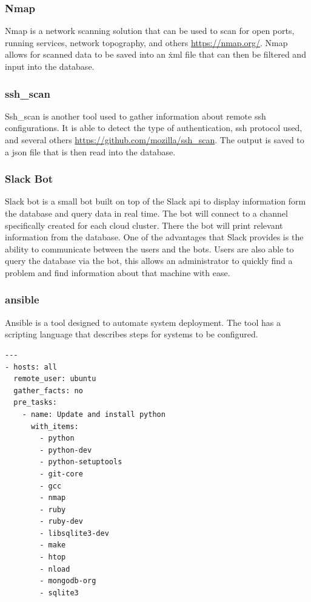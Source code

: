 \documentclass[12pt]{article}
\begin{document}
\subsubsection{Nmap}
Nmap is a network scanning solution that can be used to scan for open ports, running services, network topography, and others \href{https://nmap.org/}{https://nmap.org/}. Nmap allows for scanned data to be saved into an \.xml file that can then be filtered and input into the database.

\subsubsection{ssh\_scan}
Ssh\_scan is another tool used to gather information about remote ssh configurations. It is able to detect the type of authentication, ssh protocol used, and several others \href{https://github.com/mozilla/ssh\_scan}{https://github.com/mozilla/ssh\_scan}. The output is saved to a json file that is then read into the database.

\subsubsection{Slack Bot}
Slack bot is a small bot built on top of the Slack api to display information form the database and query data in real time. The bot will connect to a channel specifically created for each cloud cluster. There the bot will print relevant information from the database. One of the advantages that Slack provides is the ability to communicate between the users and the bots. Users are also able to query the database via the bot, this allows an administrator to quickly find a problem and find information about that machine with ease.

\subsubsection{ansible}
Ansible is a tool designed to automate system deployment. The tool has a scripting language that describes steps for systems to be configured.
\begin{mdframed}
\begin{lstlisting}
---
- hosts: all
  remote_user: ubuntu
  gather_facts: no
  pre_tasks:
    - name: Update and install python
      with_items:
        - python
        - python-dev
        - python-setuptools
        - git-core
        - gcc
        - nmap
        - ruby
        - ruby-dev
        - libsqlite3-dev
        - make
        - htop
        - nload
        - mongodb-org
        - sqlite3

\end{lstlisting}
\end{mdframed}
\end{document}
